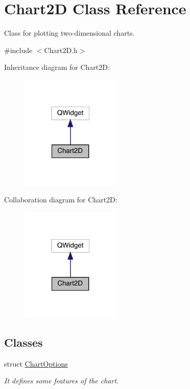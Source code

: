 \hypertarget{class_chart2_d}{}\section{Chart2D Class Reference}
\label{class_chart2_d}


Class for plotting two-\/dimensional charts.  




{\ttfamily \#include $<$Chart2\+D.\+h$>$}



Inheritance diagram for Chart2D\+:
\nopagebreak
\begin{figure}[H]
\begin{center}
\leavevmode
\includegraphics[width=135pt]{class_chart2_d__inherit__graph}
\end{center}
\end{figure}


Collaboration diagram for Chart2D\+:
\nopagebreak
\begin{figure}[H]
\begin{center}
\leavevmode
\includegraphics[width=135pt]{class_chart2_d__coll__graph}
\end{center}
\end{figure}
\subsection*{Classes}
\begin{DoxyCompactItemize}
\item 
struct \hyperlink{struct_chart2_d_1_1_chart_options}{Chart\+Options}
\begin{DoxyCompactList}\small\item\em It defines some features of the chart. \end{DoxyCompactList}\end{DoxyCompactItemize}
